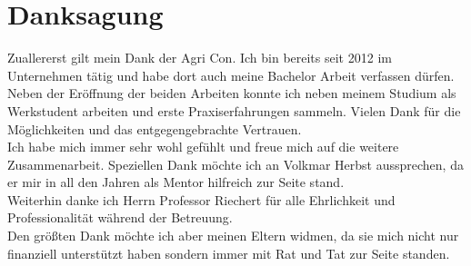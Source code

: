 
\chapter*{Danksagung}
\label{sec:Danksagung}
Zuallererst gilt mein Dank der Agri Con.
Ich bin bereits seit 2012 im Unternehmen tätig und habe dort auch meine Bachelor Arbeit verfassen dürfen.
Neben der Eröffnung der beiden Arbeiten konnte ich neben meinem Studium als Werkstudent arbeiten und erste Praxiserfahrungen sammeln.
Vielen Dank für die Möglichkeiten und das entgegengebrachte Vertrauen.\\
Ich habe mich immer sehr wohl gefühlt und freue mich auf die weitere Zusammenarbeit.
Speziellen Dank möchte ich an Volkmar Herbst aussprechen, da er mir in all den Jahren als Mentor hilfreich zur Seite stand.\\
Weiterhin danke ich Herrn Professor Riechert für alle Ehrlichkeit und Professionalität während der Betreuung.\\
Den größten Dank möchte ich aber meinen Eltern widmen, da sie mich nicht nur finanziell unterstützt haben sondern immer mit Rat und Tat zur Seite standen.